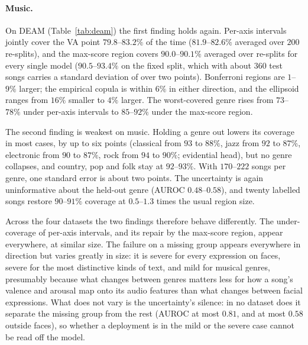 \begin{table}[h]
  \centering\small
  
  \caption{EmoBank (text; frozen RoBERTa-base encoder; nominal $90\%$, official
  split). Top: mean over five seeds (ensembles combine them). Area: Bonferroni
  area relative to the max-score region. Worst genre: lowest max-score joint
  coverage across the seven kinds of text. Bottom: each kind of text held out
  from training and calibration in turn (evidential head, three seeds). In
  training: max-score coverage on the same sentences when that kind of text
  was seen. Others: max-score coverage on the remaining kinds of text.}
  \label{tab:emobank}
\end{table}

\paragraph{Music.} On DEAM (Table~\ref{tab:deam}) the first finding holds
again. Per-axis intervals jointly cover the VA point $79.8$--$83.2\%$ of the
time ($81.9$--$82.6\%$ averaged over $200$ re-splits), and the max-score region
covers $90.0$--$90.1\%$ averaged over re-splits for every single model ($90.5$--$93.4\%$
on the fixed split, which with about $360$ test songs carries a standard
deviation of over two points). Bonferroni regions are $1$--$9\%$ larger; the
empirical copula is within $6\%$ in either direction, and the ellipsoid ranges
from $16\%$ smaller to $4\%$ larger. The worst-covered genre rises from
$73$--$78\%$ under per-axis intervals to $85$--$92\%$ under the max-score
region.

The second finding is weakest on music. Holding a genre out lowers its
coverage in most cases, by up to six points (classical from $93$ to $88\%$,
jazz from $92$ to $87\%$, electronic from $90$ to $87\%$, rock from $94$ to $90\%$;
evidential head), but no genre collapses, and country, pop and folk stay at
$92$--$93\%$. With $170$--$222$ songs per genre, one standard error is about two
points. The uncertainty is again uninformative about the held-out genre (AUROC
$0.48$--$0.58$), and twenty labelled songs restore $90$--$91\%$ coverage at
$0.5$--$1.3$ times the usual region size.

Across the four datasets the two findings therefore behave differently. The
under-coverage of per-axis intervals, and its repair by the max-score region,
appear everywhere, at similar size. The failure on a missing group appears
everywhere in direction but varies greatly in size: it is severe for every
expression on faces, severe for the most distinctive kinds of text, and mild
for musical genres, presumably because what changes between genres matters
less for how a song's valence and arousal map onto its audio features than
what changes between facial expressions. What does not vary is the
uncertainty's silence: in no dataset does it separate the missing group from
the rest (AUROC at most $0.81$, and at most $0.58$ outside faces), so whether
a deployment is in the mild or the severe case cannot be read off the model.

